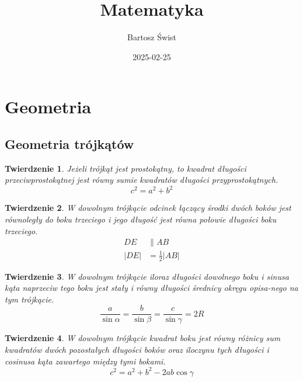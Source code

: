 \documentclass{article}
\title{Matematyka}
\date{2025-02-25}
\author{Bartosz Świst}
\numberwithin{equation}{section}
\newtheorem{theorem}{Twierdzenie}[section]
\begin{document}
  \maketitle
  \newpage

  \section{Geometria}
    \subsection{Geometria trójkątów}
      \begin{theorem}
        Jeżeli trójkąt jest prostokątny, to kwadrat długości przeciwprostokątnej jest równy sumie kwadratów długości przyprostokątnych.
        \begin{equation}
          c^2 = a^2 + b^2
        \end{equation}
      \end{theorem}
      \begin{theorem}
        W dowolnym trójkącie odcinek łączący środki dwóch boków jest równoległy do boku trzeciego i jego długość jest równa połowie długości boku trzeciego.
        \begin{equation}
          \begin{aligned}
            DE &\parallel AB\\
            |DE| &= \frac 12|AB|
          \end{aligned}
        \end{equation}
      \end{theorem}
      \begin{theorem}
        W dowolnym trójkącie iloraz długości dowolnego boku i sinusa kąta naprzeciw tego boku jest stały i równy długości średnicy okręgu opisa-\-nego na tym trójkącie.
        \begin{equation}
          \frac{a}{\sin\alpha} = \frac{b}{\sin\beta} = \frac{c}{\sin\gamma} = 2R
        \end{equation}
      \end{theorem}
      \begin{theorem}
        W dowolnym trójkącie kwadrat boku jest równy różnicy sum kwadratów dwóch pozostałych długości boków oraz iloczynu tych długości i cosinusa kąta zawartego między tymi bokami.
        \begin{equation}
          c^2 = a^2 + b^2 - 2ab\cos\gamma
        \end{equation}
      \end{theorem}
\end{document}
